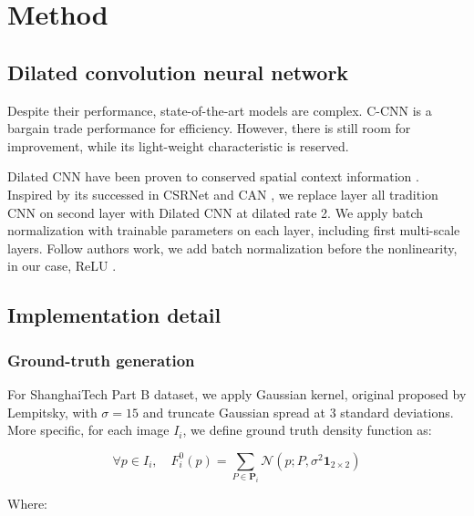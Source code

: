 \section{Method}

\subsection{Dilated convolution neural network}
Despite their performance, state-of-the-art models are complex. C-CNN is a bargain trade performance for efficiency. However, there is still room for improvement, while its light-weight characteristic is reserved. 

Dilated CNN have been proven to conserved spatial context information \cite{li2018csrnet}. Inspired by its successed in CSRNet \cite{li2018csrnet} and CAN \cite{liu2019context}, we replace layer all tradition CNN on second layer with Dilated CNN at dilated rate 2. We apply batch normalization \cite{ioffe2015batch} with trainable parameters on each layer, including first multi-scale layers. Follow authors work, we add batch normalization before the nonlinearity, in our case, ReLU \cite{agarap2018deep}. 






\subsection{Implementation detail}

\subsubsection{Ground-truth generation} \hfill

For ShanghaiTech Part B dataset, we apply Gaussian kernel, original proposed by Lempitsky, \cite{lempitsky2010learning} with $\sigma = 15$ and truncate Gaussian spread at 3 standard deviations. More specific, for each image $I_i$, we define ground truth density function as: 

\begin{equation} \label{eq:densit-function}
\forall p \in I_{i}, \quad F_{i}^{0}(p)=\sum_{P \in \mathbf{P}_{i}} \mathcal{N}\left(p ; P, \sigma^{2} \mathbf{1}_{2 \times 2}\right) 
\end{equation}

Where: 





